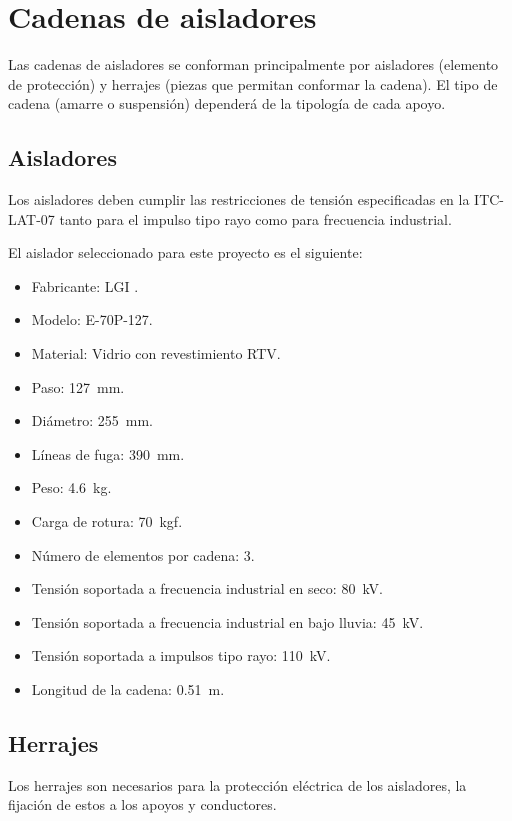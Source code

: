 \section{Cadenas de aisladores}
\label{sec:md-aisladores}
Las cadenas de aisladores se conforman principalmente por aisladores (elemento de protección) y herrajes (piezas que permitan conformar la cadena). El tipo de cadena (amarre o suspensión) dependerá de la tipología de cada apoyo.
\subsection{Aisladores}
\label{subsec:md-aisladores}
Los aisladores deben cumplir las restricciones de tensión especificadas en la ITC-LAT-07 tanto para el impulso tipo rayo como para frecuencia industrial.

El aislador seleccionado para este proyecto es el siguiente:
\begin{itemize}
  \item Fabricante: \ac{LGI} \cite{LaGranja_Catalogo_2019}.
  \item Modelo: E-70P-127.
  \item Material: Vidrio con revestimiento \ac{RTV}.
  \item Paso: \SI{127}{\milli\meter}.
  \item Diámetro: \SI{255}{\milli\meter}.
  \item Líneas de fuga: \SI{390}{\milli\meter}.
  \item Peso: \SI{4.6}{\kilogram}.
  \item Carga de rotura: \SI{70}{kgf}.
  \item Número de elementos por cadena: 3.
  \item Tensión soportada a frecuencia industrial en seco: \SI{80}{\kilo\volt}.
  \item Tensión soportada a frecuencia industrial en bajo lluvia: \SI{45}{\kilo\volt}.
  \item Tensión soportada a impulsos tipo rayo: \SI{110}{\kilo\volt}.
  \item Longitud de la cadena: \SI{0.51}{\meter}.
\end{itemize}
\subsection{Herrajes}
\label{subsec:aisladores}
Los herrajes son necesarios para la protección eléctrica de los aisladores, la fijación de estos a los apoyos y conductores.

